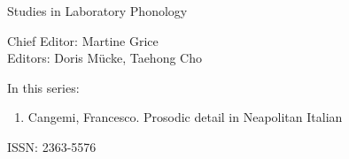 
{\raggedleft{}}

\bigskip

{\large Studies in Laboratory Phonology}

\bigskip

Chief Editor:  Martine Grice%
\\
Editors:    Doris Mücke, %
    Taehong Cho %

\bigskip

In this series:

\begin{enumerate}
\item Cangemi, Francesco. Prosodic detail in Neapolitan Italian
\end{enumerate}

\vfill

\gdef\lsISSN{2363-5576}%
\hfill ISSN: \lsISSN




